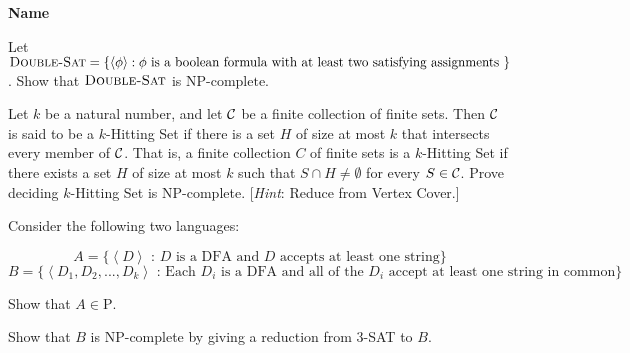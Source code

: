 \documentclass[ps, letterpaper]{cs121}
\begin{document}

\vspace{3mm}
\begin{center} \bf{Name} \end{center}

\newcommand{\<}{\langle}
\renewcommand{\>}{\rangle}

\renewcommand{\P}{\mathrm{P}}
\renewcommand{\NP}{\mathrm{NP}}
\newcommand{\NST}{\mathrm{NST}}
\newcommand{\CoNP}{\mathrm{\text{Co-}NP}}
\newcommand{\NPC}{\mathrm{NP}\text{-complete}}
\newcommand{\PSPACE}{\mathrm{PSPACE}}
\newcommand{\NPSPACE}{\mathrm{NPSPACE}}
\newcommand{\DSPACE}{\mathrm{DSPACE}}
\newcommand{\DoubleSAT}{\textsc{Double-Sat}}
\newcommand{\Primes}{\textsc{Primes}}
\newcommand{\abs}[1]{\lvert#1\rvert}

\setlength\parskip{2mm}
\subproblem
Let $\DoubleSAT= \{\<\phi\>: \text{$\phi$ is a boolean formula with at least two satisfying assignments }\}$. Show that $\DoubleSAT$ is $\NPC$.

\subproblem
Let $k$ be a natural number, and let ${\cal C}$ be a finite collection of finite sets. Then ${\cal C}$ is said to be a $k$-{\sc Hitting Set} if there is a set $H$ of size at most $k$ that intersects every member of ${\cal C}$. That is, a finite collection $C$ of finite sets is  a $k$-{\sc Hitting Set} if there exists a set $H$ of size at most $k$ such that $S\cap H\neq\emptyset$ for every $S \in {\cal C}$. Prove deciding $k$-{\sc Hitting Set} is $\NP$-complete.  [\emph{Hint}: Reduce from {\sc Vertex Cover}.]

Consider the following two languages:

$$A=\{\left<D\right>\text{ : $D$ is a DFA and $D$ accepts at least one string}\}$$
$$B=\{\left<D_1,D_2,...,D_k\right>\text{ : Each $D_i$ is a DFA and all of the $D_i$ accept at least one string in common} \}$$

\subproblem Show that $A \in \P$.

\subproblem Show that $B$ is $\NP$-complete by giving a reduction from 3-SAT to $B$.
\end{document}
